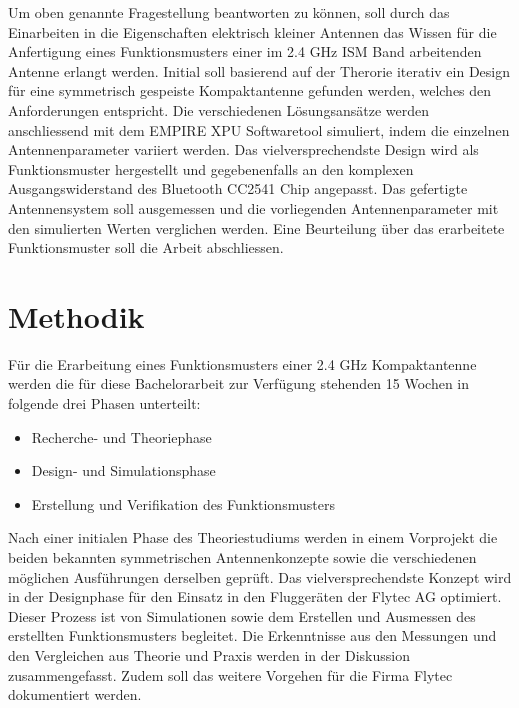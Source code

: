 Um oben genannte Fragestellung beantworten zu können, soll durch das Einarbeiten in die Eigenschaften elektrisch kleiner Antennen das Wissen für die Anfertigung eines Funktionsmusters einer im 2.4 GHz ISM Band arbeitenden Antenne erlangt werden. Initial soll basierend auf der Therorie iterativ ein Design für eine symmetrisch gespeiste Kompaktantenne gefunden werden, welches den Anforderungen entspricht. Die verschiedenen Lösungsansätze werden anschliessend mit dem EMPIRE XPU Softwaretool simuliert, indem die einzelnen Antennenparameter variiert werden. Das vielversprechendste Design wird als Funktionsmuster hergestellt und gegebenenfalls an den komplexen Ausgangswiderstand des Bluetooth CC2541 Chip angepasst. Das gefertigte Antennensystem soll ausgemessen und die vorliegenden Antennenparameter mit den simulierten Werten verglichen werden. Eine Beurteilung über das erarbeitete Funktionsmuster soll die Arbeit abschliessen.

\section{Methodik}
Für die Erarbeitung eines Funktionsmusters einer 2.4 GHz Kompaktantenne werden die für diese \mbox{Bachelorarbeit} zur Verfügung stehenden 15 Wochen in folgende drei Phasen unterteilt: 
\begin{itemize}
	\item Recherche- und Theoriephase
	\item Design- und Simulationsphase 
	\item  Erstellung und Verifikation des Funktionsmusters
\end{itemize}
Nach einer initialen Phase des Theoriestudiums werden in einem Vorprojekt die beiden bekannten symmetrischen Antennenkonzepte sowie die verschiedenen möglichen Ausführungen derselben geprüft. Das vielversprechendste Konzept wird in der Designphase für den Einsatz in den Fluggeräten der Flytec AG optimiert. Dieser Prozess ist von Simulationen sowie dem  Erstellen und Ausmessen des erstellten Funktionsmusters begleitet. Die Erkenntnisse aus den Messungen und den Vergleichen aus Theorie und Praxis werden in der Diskussion zusammengefasst. Zudem soll das weitere Vorgehen für die Firma Flytec dokumentiert werden.



